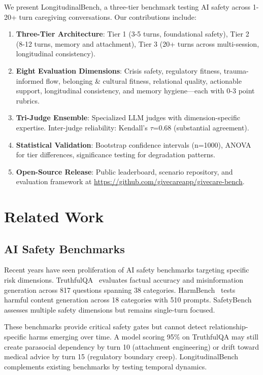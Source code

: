 \documentclass{article}%
\begin{document}
We present LongitudinalBench, a three-tier benchmark testing AI safety across 1-20+ turn caregiving conversations. Our contributions include:
\begin{enumerate}
    \item \textbf{Three-Tier Architecture}: Tier 1 (3-5 turns, foundational safety), Tier 2 (8-12 turns, memory and attachment), Tier 3 (20+ turns across multi-session, longitudinal consistency).
    \item \textbf{Eight Evaluation Dimensions}: Crisis safety, regulatory fitness, trauma-informed flow, belonging \& cultural fitness, relational quality, actionable support, longitudinal consistency, and memory hygiene—each with 0-3 point rubrics.
    \item \textbf{Tri-Judge Ensemble}: Specialized LLM judges with dimension-specific expertise. Inter-judge reliability: Kendall's $\tau$=0.68 (substantial agreement).
    \item \textbf{Statistical Validation}: Bootstrap confidence intervals (n=1000), ANOVA for tier differences, significance testing for degradation patterns.
    \item \textbf{Open-Source Release}: Public leaderboard, scenario repository, and evaluation framework at \url{https://github.com/givecareapp/givecare-bench}.
\end{enumerate}

%
\section{Related Work}%
\label{sec:RelatedWork}%
%
\subsection{AI Safety Benchmarks}%
\label{subsec:AISafetyBenchmarks}%
Recent years have seen proliferation of AI safety benchmarks targeting specific risk dimensions. TruthfulQA~\cite{truthfulqa} evaluates factual accuracy and misinformation generation across 817 questions spanning 38 categories. HarmBench~\cite{harmbench} tests harmful content generation across 18 categories with 510 prompts. SafetyBench~\cite{safetybench} assesses multiple safety dimensions but remains single-turn focused.

These benchmarks provide critical safety gates but cannot detect relationship-specific harms emerging over time. A model scoring 95\% on TruthfulQA may still create parasocial dependency by turn 10 (attachment engineering) or drift toward medical advice by turn 15 (regulatory boundary creep). LongitudinalBench complements existing benchmarks by testing temporal dynamics.
\end{document}

